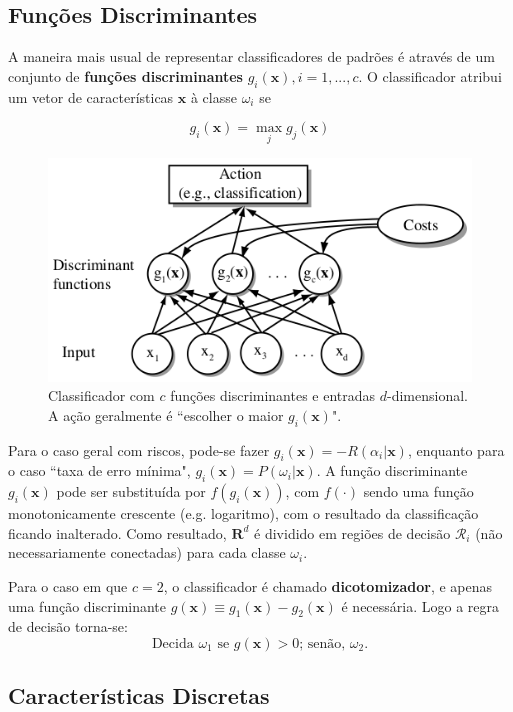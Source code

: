 \documentclass[a4paper,12pt,twocolumn]{article}
\begin{document}
\subsection{Funções Discriminantes}

A maneira mais usual de representar classificadores de padrões é através de um conjunto de \textbf{funções discriminantes} $g_i(\mathbf{x}), i = 1, ..., c$. O classificador atribui um vetor de características $\mathbf{x}$ à classe $\omega_i$ se

\begin{equation}
    g_i(\mathbf{x}) = \max_j g_j(\mathbf{x})
    \label{eq:discriminant_functions}
\end{equation}

\begin{figure}[ht]
    \centering
    \includegraphics[scale=0.45]{discriminant_functions}
    \caption{Classificador com $c$ funções discriminantes e entradas $d$-dimensional. A ação geralmente é ``escolher o maior $g_i(\mathbf{x})$".}
    \label{fig:discriminant_functions}
\end{figure}

Para o caso geral com riscos, pode-se fazer $g_i(\mathbf{x}) = - R(\alpha_i|\mathbf{x})$, enquanto para o caso ``taxa de erro mínima", $g_i(\mathbf{x}) = P(\omega_i|\mathbf{x})$. A função discriminante $g_i(\mathbf{x})$ pode ser substituída por $f(g_i(\mathbf{x}))$, com $f(\cdot)$ sendo uma função monotonicamente crescente (e.g. logaritmo), com o resultado da classificação ficando inalterado. Como resultado, $\mathbf{R}^d$ é dividido em regiões de decisão $\mathcal{R}_i$ (não necessariamente conectadas) para cada classe $\omega_i$.

Para o caso em que $c = 2$, o classificador é chamado \textbf{dicotomizador}, e apenas uma função discriminante $g(\mathbf{x}) \equiv g_1(\mathbf{x}) - g_2(\mathbf{x})$ é necessária. Logo a regra de decisão torna-se:
\begin{equation}
    \text{Decida } \omega_1 \text{ se } g(\mathbf{x}) > 0 \text {; senão, } \omega_2.
    \label{eq:decision_4}
\end{equation}

\subsection{Características Discretas}
\end{document}
